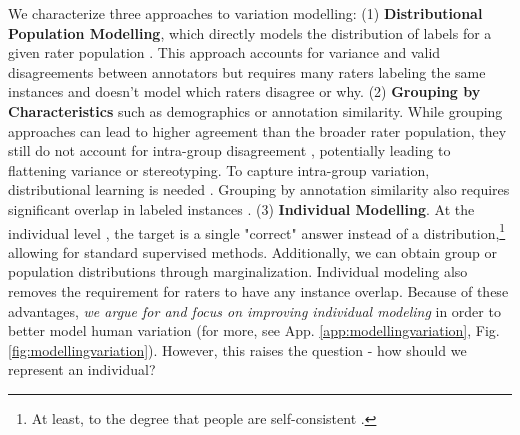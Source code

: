 \documentclass[11pt]{article}
\begin{document}
We characterize three approaches to variation modelling:
(1) {\textbf{Distributional Population Modelling}}, which directly models the distribution of labels for a given rater population \citep{zhang2024divergingpreferencesannotatorsdisagree, siththaranjan2024distributionalpreferencelearningunderstanding}. This approach accounts for variance and valid disagreements between annotators but requires many raters labeling the same instances and doesn't model which raters disagree or why. (2)  {\textbf{Grouping by Characteristics}} such as demographics or annotation similarity. While grouping approaches can lead to higher agreement than the broader rater population, they still do not account for intra-group disagreement \citep{hwang2023aligninglanguagemodelsuser, prabhakaran-etal-2024-grasp}, potentially leading to flattening variance or stereotyping.
To capture intra-group variation, distributional learning is needed \citep{meister2024benchmarkingdistributionalalignmentlarge}.
Grouping by annotation similarity also requires significant overlap in labeled instances \citep{li-etal-2024-steerability}.
(3) {\textbf{ Individual Modelling}}. At the individual level \citep{Gordon_2022, jiang2024languagemodelsreasonindividualistic},
the target is a single "correct" answer instead of a distribution,\footnote{ At least, to the degree that people are self-consistent \citep{abercrombie2023consistencykeydisentanglinglabel}.}
allowing for standard supervised methods.
Additionally, we can obtain group or population distributions through marginalization. Individual modeling also removes the requirement for raters to have any instance overlap. 
Because of these advantages, \textit{we argue for and focus on improving individual modeling} in order to better model human variation
(for more, see App. \ref{app:modellingvariation}, Fig. \ref{fig:modellingvariation}).
However, this raises the question - how should we represent an individual?
\end{document}
